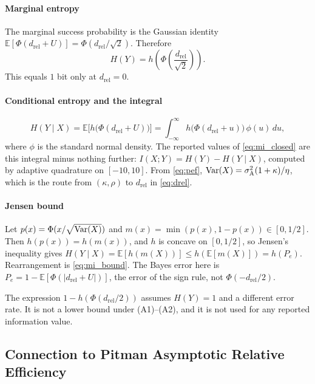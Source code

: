 \paragraph*{Marginal entropy}

The marginal success probability is the Gaussian identity $\mathbb{E}[\Phi(d_{\mathrm{rel}}+U)]=\Phi(d_{\mathrm{rel}}/\sqrt{2})$. Therefore
\begin{equation*}
  H(Y) = h\!\left(\Phi\!\left(\frac{d_{\mathrm{rel}}}{\sqrt{2}}\right)\right).
\end{equation*}
This equals $1$ bit only at $d_{\mathrm{rel}}=0$.

\paragraph*{Conditional entropy and the integral}

\begin{equation*}
  H(Y\mid X) = \mathbb{E}\bigl[h\bigl(\Phi(d_{\mathrm{rel}}+U)\bigr)\bigr]
  = \int_{-\infty}^{\infty} h\bigl(\Phi(d_{\mathrm{rel}}+u)\bigr)\,\phi(u)\,du,
\end{equation*}
where $\phi$ is the standard normal density. The reported values of \cref{eq:mi_closed} are this integral minus nothing further: $I(X;Y)=H(Y)-H(Y\mid X)$, computed by adaptive quadrature on $[-10,10]$. From \cref{eq:pef}, $\operatorname{Var}(X)=\sigma^{2}_{\mathrm{A}}(1+\kappa)/\eta$, which is the route from $(\kappa,\rho)$ to $d_{\mathrm{rel}}$ in \cref{eq:drel}.

\paragraph*{Jensen bound}

Let $p(x)=\Phi(x/\sqrt{\operatorname{Var}(X)})$ and $m(x)=\min(p(x),1-p(x))\in[0,1/2]$. Then $h(p(x))=h(m(x))$, and $h$ is concave on $[0,1/2]$, so Jensen's inequality gives $H(Y\mid X)=\mathbb{E}[h(m(X))]\le h(\mathbb{E}[m(X)])=h(P_{e})$. Rearrangement is \cref{eq:mi_bound}. The Bayes error here is $P_{e}=1-\mathbb{E}[\Phi(|d_{\mathrm{rel}}+U|)]$, the error of the sign rule, not $\Phi(-d_{\mathrm{rel}}/2)$.

The expression $1-h(\Phi(d_{\mathrm{rel}}/2))$ assumes $H(Y)=1$ and a different error rate. It is not a lower bound under (A1)--(A2), and it is not used for any reported information value.

\subsection*{Connection to Pitman Asymptotic Relative Efficiency}
\label{sec:pitman}

